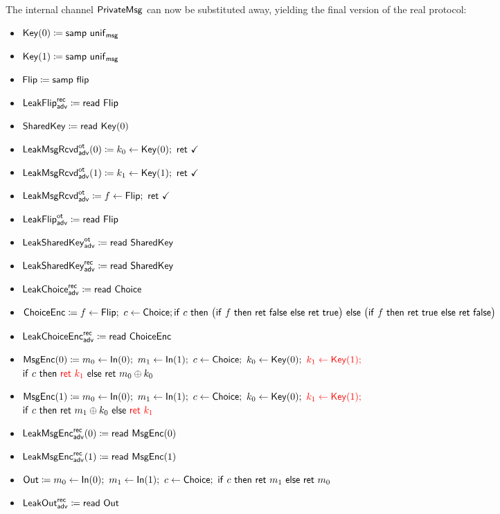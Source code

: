 \noindent The internal channel $\mathsf{PrivateMsg}$ can now be substituted away, yielding the final version of the real protocol:

\begin{itemize}
\item $\mathsf{Key}(0) \coloneqq \mathsf{samp} \ \mathsf{unif}_{\mathsf{msg}}$
\item $\mathsf{Key}(1) \coloneqq \mathsf{samp} \ \mathsf{unif}_{\mathsf{msg}}$
\item $\mathsf{Flip} \coloneqq \mathsf{samp} \ \mathsf{flip}$
\item {\color{blue} $\mathsf{LeakFlip}^{\mathsf{rec}}_{\mathsf{adv}} \coloneqq \mathsf{read} \ \mathsf{Flip}$}
\item $\mathsf{SharedKey} \coloneqq \mathsf{read} \ \mathsf{Key}(0)$
\item {\color{blue} $\LeakKeyRcvd^\ot_\adv(0) \coloneqq k_0 \leftarrow \Key(0); \ \ret{\checkmark}$}
\item {\color{blue} $\LeakKeyRcvd^\ot_\adv(1) \coloneqq k_1 \leftarrow \Key(1); \ \ret{\checkmark}$}
\item {\color{blue} $\mathsf{LeakMsgRcvd}^{\mathsf{ot}}_{\mathsf{adv}} \coloneqq f \leftarrow \mathsf{Flip}; \ \mathsf{ret} \ \checkmark$}
\item {\color{blue} $\mathsf{LeakFlip}^{\mathsf{ot}}_{\mathsf{adv}} \coloneqq \mathsf{read} \ \mathsf{Flip}$}
\item {\color{blue} $\mathsf{LeakSharedKey}^{\mathsf{ot}}_{\mathsf{adv}} \coloneqq \mathsf{read} \ \mathsf{SharedKey}$}
\item {\color{blue} $\mathsf{LeakSharedKey}^{\mathsf{rec}}_{\mathsf{adv}} \coloneqq \mathsf{read} \ \mathsf{SharedKey}$}
\item {\color{blue} $\mathsf{LeakChoice}^{\mathsf{rec}}_{\mathsf{adv}} \coloneqq \mathsf{read} \ \mathsf{Choice}$}
\item $\mathsf{ChoiceEnc} \coloneqq f \leftarrow \mathsf{Flip}; \ c \leftarrow \mathsf{Choice}; \\ \mathsf{if} \ c \ \mathsf{then} \ \big(\mathsf{if} \ f \ \mathsf{then} \ \mathsf{ret} \ \mathsf{false} \ \mathsf{else} \ \mathsf{ret} \ \mathsf{true}\big) \ \mathsf{else} \ \big(\mathsf{if} \ f \ \mathsf{then} \ \mathsf{ret} \ \mathsf{true} \ \mathsf{else} \ \mathsf{ret} \ \mathsf{false}\big)$
\item {\color{blue} $\mathsf{LeakChoiceEnc}^{\mathsf{rec}}_{\mathsf{adv}} \coloneqq \mathsf{read} \ \mathsf{ChoiceEnc}$}
\item $\mathsf{MsgEnc}(0) \coloneqq m_0 \leftarrow \mathsf{In}(0); \ m_1 \leftarrow \mathsf{In}(1); \ c \leftarrow \mathsf{Choice}; \ k_0 \leftarrow \mathsf{Key}(0); \ {\color{red} k_1 \leftarrow \mathsf{Key}(1);}$ \\ $\mathsf{if} \ c \ \mathsf{then} \ {\color{red} \mathsf{ret} \ k_1} \ \mathsf{else} \ \mathsf{ret} \ m_0 \oplus k_0$
\item $\mathsf{MsgEnc}(1) \coloneqq m_0 \leftarrow \mathsf{In}(0); \ m_1 \leftarrow \mathsf{In}(1); \ c \leftarrow \mathsf{Choice}; \ k_0 \leftarrow \mathsf{Key}(0); \ {\color{red} k_1 \leftarrow \mathsf{Key}(1);}$ \\ $\mathsf{if} \ c \ \mathsf{then} \ \mathsf{ret} \ m_1 \oplus k_0 \ \mathsf{else} \ {\color{red} \mathsf{ret} \ k_1}$
\item {\color{blue} $\mathsf{LeakMsgEnc}^{\mathsf{rec}}_{\mathsf{adv}}(0) \coloneqq \mathsf{read} \ \mathsf{MsgEnc}(0)$}
\item {\color{blue} $\mathsf{LeakMsgEnc}^{\mathsf{rec}}_{\mathsf{adv}}(1) \coloneqq \mathsf{read} \ \mathsf{MsgEnc}(1)$}
\item $\Out \coloneqq m_0 \leftarrow \In(0); \ m_1 \leftarrow \In(1); \ c \leftarrow \Choice; \ \ifte{c}{\ret{m_1}}{\ret{m_0}}$
\item {\color{blue} $\mathsf{LeakOut}^{\mathsf{rec}}_{\mathsf{adv}} \coloneqq \mathsf{read} \ \mathsf{Out}$}
\end{itemize}

